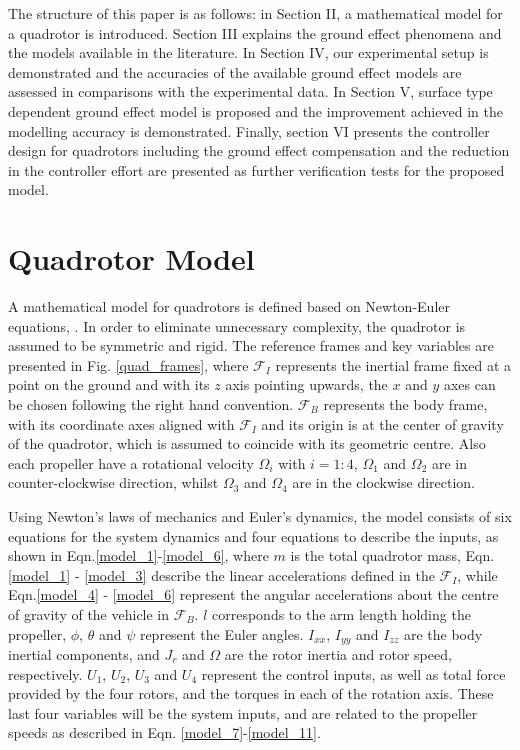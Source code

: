 \documentclass[twocolumn,10pt]{asme2ej}
\begin{document}
The structure of this paper is as follows: in Section II, a mathematical model for a quadrotor is introduced. Section III explains the ground effect phenomena and the models available in the literature. In Section IV, our experimental setup is demonstrated and the accuracies of the available ground effect models are assessed in comparisons with the experimental data. In Section V, surface type dependent ground effect model is proposed  and the improvement achieved in the modelling accuracy is demonstrated. Finally, section VI presents the controller design for quadrotors including the ground effect compensation and the reduction in the controller effort are presented as further verification tests for the proposed model.

\section{Quadrotor Model}\label{quad_model_section}
A mathematical model for quadrotors is defined based on Newton-Euler equations, \cite{GarciaCarrillo2013} \cite{Bouabdallah2005}. In order to eliminate unnecessary complexity, the quadrotor is assumed to be symmetric and rigid. The reference frames and key variables are presented in Fig. \ref{quad_frames}, where $\mathcal{F}_{I}$ represents the inertial frame fixed at a point on the ground and with its $z$ axis pointing upwards, the $x$ and $y$ axes can be chosen following the right hand convention. $\mathcal{F}_{B}$ represents the body frame, with its coordinate axes aligned with $\mathcal{F}_{I}$ and its origin is at the center of gravity of the quadrotor, which is assumed to coincide with its geometric centre. Also each propeller have a rotational velocity $\Omega_{i}$ with $i=1:4$, $\Omega_{1}$ and $\Omega_{2}$ are in counter-clockwise direction, whilst $\Omega_{3}$ and $\Omega_{4}$ are in the clockwise direction.

Using Newton's laws of mechanics and Euler's dynamics, the model consists of six equations for the system dynamics and four equations to describe the inputs, as shown in Eqn.\eqref{model_1}-\eqref{model_6}, where $m$ is the total quadrotor mass, Eqn.\eqref{model_1} - \eqref{model_3} describe the linear accelerations defined in the $\mathcal{F}_{I}$, while Eqn.\eqref{model_4} - \eqref{model_6} represent the angular accelerations about the centre of gravity of the vehicle in $\mathcal{F}_{B}$. $l$ corresponds to the arm length holding the propeller, $\phi$, $\theta$ and $\psi$ represent the Euler angles. $I_{xx}$, $I_{yy}$ and $I_{zz}$ are the body inertial components, and $J_{r}$ and $\Omega$ are the rotor inertia and rotor speed, respectively. $U_{1}$, $U_{2}$, $U_{3}$ and $U_{4}$ represent the control inputs, as well as total force provided by the four rotors, and the torques in each of the rotation axis. These last four variables will be the system inputs, and are related to the propeller speeds as described in Eqn. \eqref{model_7}-\eqref{model_11}. 
\end{document}
